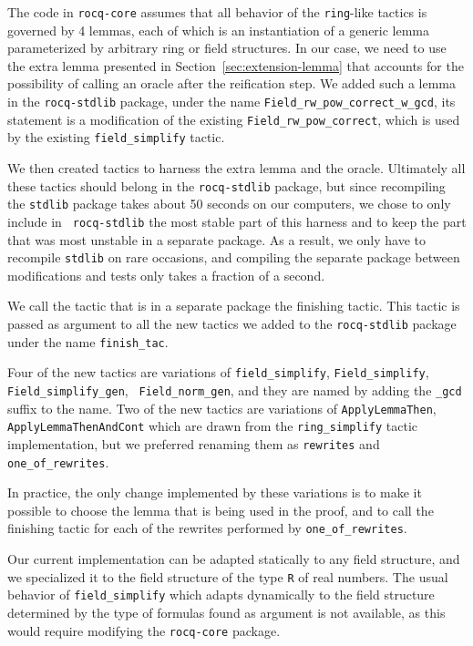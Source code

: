 \documentclass{jflart}
\begin{document}
The code in \texttt{rocq-core} assumes that all behavior of the \texttt{ring}-like tactics is governed by 4 lemmas, each of which is an
instantiation of a generic lemma parameterized by arbitrary ring or
field structures.  In our case, we need to use the extra lemma presented in
Section~\ref{sec:extension-lemma} that
accounts for the possibility of calling an oracle after the
reification step.  We added such a lemma in the \texttt{rocq-stdlib}
package, under the name \texttt{Field\_rw\_pow\_correct\_w\_gcd}, its
statement is a modification of the existing \texttt{Field\_rw\_pow\_correct}, which is used by the existing
\texttt{field\_simplify} tactic.

We then created tactics to harness the extra lemma and the oracle.
Ultimately all these tactics should belong in the \texttt{rocq-stdlib}
package, but since recompiling the \texttt{stdlib} package takes about 50
seconds on our computers, we chose to only include in \texttt{
  rocq-stdlib} the most stable part of this harness
and to keep the part that was most unstable in a separate package.  As
a result, we only have to recompile \texttt{stdlib} on rare occasions,
and compiling the separate package between modifications and tests
only takes a fraction of a second.

We call the tactic that is in a separate package the finishing tactic.
This tactic is passed as argument to all the new tactics we added to
the \texttt{rocq-stdlib} package under the name \texttt{finish\_tac}.

Four of the new tactics are variations of \texttt{field\_simplify},
\texttt{Field\_simplify}, \break \texttt{Field\_simplify\_gen}, \texttt{
  Field\_norm\_gen}, and they are named by adding the \texttt{\_gcd}
suffix to the name.  Two of the new tactics are variations of
\texttt{ApplyLemmaThen}, \texttt{ApplyLemmaThenAndCont} which
are drawn from the \texttt{ring\_simplify} tactic implementation, but we
preferred renaming them as \texttt{rewrites} and \texttt{one\_of\_rewrites}.

In practice, the only change implemented by these variations is to
make it possible to choose the lemma that is being used in the proof,
and to call the finishing tactic for each of the rewrites performed by
\texttt{one\_of\_rewrites}.

Our current implementation can be adapted statically to any field structure,
and we specialized it to the field structure of the type \texttt{R} of real
numbers.  The usual behavior of \texttt{field\_simplify} which adapts
dynamically to the field structure determined by the type of formulas found
as argument is not available, as this would require modifying the
\texttt{rocq-core} package.
\end{document}
